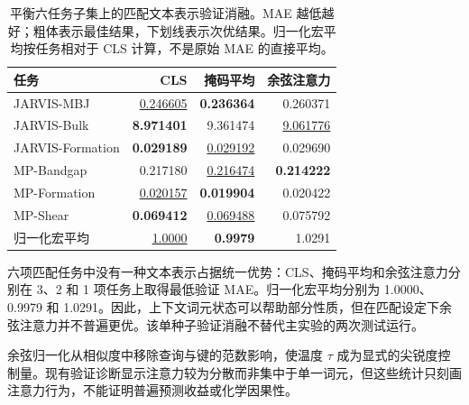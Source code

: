 \documentclass[a4paper,fleqn]{cas-sc}
\begin{document}
\begin{table}[H]\caption{平衡六任务子集上的匹配文本表示验证消融。MAE 越低越好；粗体表示最佳结果，下划线表示次优结果。归一化宏平均按任务相对于 CLS 计算，不是原始 MAE 的直接平均。}\label{tab:matched_text}\centering\scriptsize
\begin{tabular}{lrrr}\toprule 任务&CLS&掩码平均&余弦注意力\\\midrule
JARVIS-MBJ&\underline{0.246605}&\textbf{0.236364}&0.260371\\JARVIS-Bulk&\textbf{8.971401}&9.361474&\underline{9.061776}\\JARVIS-Formation&\textbf{0.029189}&\underline{0.029192}&0.029690\\MP-Bandgap&0.217180&\underline{0.216474}&\textbf{0.214222}\\MP-Formation&\underline{0.020157}&\textbf{0.019904}&0.020422\\MP-Shear&\textbf{0.069412}&\underline{0.069488}&0.075792\\\midrule
归一化宏平均&\underline{1.0000}&\textbf{0.9979}&1.0291\\\bottomrule\end{tabular}\end{table}

六项匹配任务中没有一种文本表示占据统一优势：CLS、掩码平均和余弦注意力分别在 3、2 和 1 项任务上取得最低验证 MAE。归一化宏平均分别为 1.0000、0.9979 和 1.0291。因此，上下文词元状态可以帮助部分性质，但在匹配设定下余弦注意力并不普遍更优。该单种子验证消融不替代主实验的两次测试运行。

余弦归一化从相似度中移除查询与键的范数影响，使温度 $\tau$ 成为显式的尖锐度控制量。现有验证诊断显示注意力较为分散而非集中于单一词元，但这些统计只刻画注意力行为，不能证明普遍预测收益或化学因果性。
\end{document}
